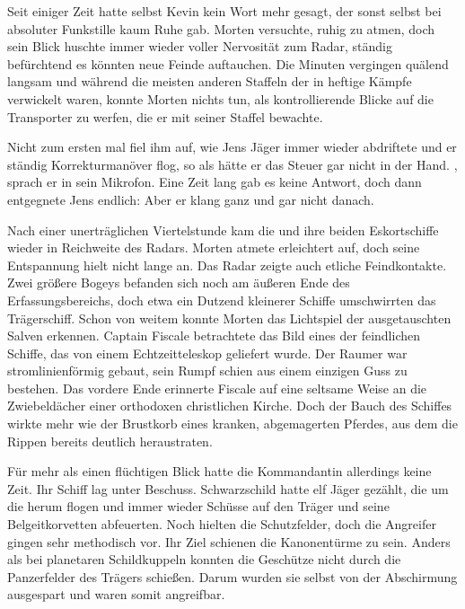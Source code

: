 \par

Seit einiger Zeit hatte selbst Kevin kein Wort mehr gesagt, der sonst selbst bei absoluter Funkstille kaum Ruhe gab. Morten versuchte, ruhig zu atmen, doch sein Blick huschte immer wieder voller Nervosität zum Radar, ständig befürchtend es könnten neue Feinde auftauchen. Die Minuten vergingen quälend langsam und während die meisten anderen Staffeln der  in heftige Kämpfe verwickelt waren, konnte Morten nichts tun, als kontrollierende Blicke auf die Transporter zu werfen, die er mit seiner Staffel bewachte.

\par

Nicht zum ersten mal fiel ihm auf, wie Jens Jäger immer wieder abdriftete und er ständig Korrekturmanöver flog, so als hätte er das Steuer gar nicht in der Hand. , sprach er in sein Mikrofon. Eine Zeit lang gab es keine Antwort, doch dann entgegnete Jens endlich:  Aber er klang ganz und gar nicht danach.

\par

Nach einer unerträglichen Viertelstunde kam die  und ihre beiden Eskortschiffe wieder in Reichweite des Radars. Morten atmete erleichtert auf, doch seine Entspannung hielt nicht lange an. Das Radar zeigte auch etliche Feindkontakte. Zwei größere Bogeys befanden sich noch am äußeren Ende des Erfassungsbereichs, doch etwa ein Dutzend kleinerer Schiffe umschwirrten das Trägerschiff. Schon von weitem konnte Morten das Lichtspiel der ausgetauschten Salven erkennen.
\ortswechsel
Captain Fiscale betrachtete das Bild eines der feindlichen Schiffe, das von einem Echtzeitteleskop geliefert wurde. Der Raumer war stromlinienförmig gebaut, sein Rumpf schien aus einem einzigen Guss zu bestehen. Das vordere Ende erinnerte Fiscale auf eine seltsame Weise an die Zwiebeldächer einer orthodoxen christlichen Kirche. Doch der Bauch des Schiffes wirkte mehr wie der Brustkorb eines kranken, abgemagerten Pferdes, aus dem die Rippen bereits deutlich heraustraten.

\par

Für mehr als einen flüchtigen Blick hatte die Kommandantin allerdings keine Zeit. Ihr Schiff lag unter Beschuss. Schwarzschild hatte elf Jäger gezählt, die um die  herum flogen und immer wieder Schüsse auf den Träger und seine Belgeitkorvetten abfeuerten. Noch hielten die Schutzfelder, doch die Angreifer gingen sehr methodisch vor. Ihr Ziel schienen die Kanonentürme zu sein. Anders als bei planetaren Schildkuppeln konnten die Geschütze nicht durch die Panzerfelder des Trägers schießen. Darum wurden sie selbst von der Abschirmung ausgespart und waren somit angreifbar.

